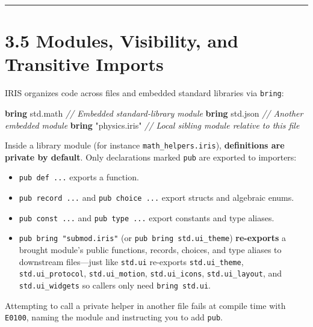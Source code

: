 \documentclass[
  english,
  oneside]{book}
\newenvironment{Shaded}{\begin{snugshade}}{\end{snugshade}}
\newcommand{\CommentTok}[1]{\textcolor[rgb]{0.42,0.60,0.33}{\textit{#1}}}
\newcommand{\KeywordTok}[1]{\textcolor[rgb]{0.34,0.61,0.84}{\textbf{#1}}}
\newcommand{\NormalTok}[1]{\textcolor[rgb]{0.83,0.83,0.83}{#1}}
\newcommand{\OperatorTok}[1]{\textcolor[rgb]{0.83,0.83,0.83}{#1}}
\newcommand{\StringTok}[1]{\textcolor[rgb]{0.81,0.57,0.47}{#1}}
\providecommand{\tightlist}{%
  \setlength{\itemsep}{0pt}\setlength{\parskip}{0pt}}
\begin{document}
\begin{center}\rule{0.5\linewidth}{0.5pt}\end{center}

\section{3.5 Modules, Visibility, and Transitive
Imports}\label{modules-visibility-and-transitive-imports}

IRIS organizes code across files and embedded standard libraries via
\texttt{bring}:

\begin{Shaded}
\begin{Highlighting}[]
\KeywordTok{bring}\NormalTok{ std}\OperatorTok{.}\NormalTok{math              }\CommentTok{// Embedded standard{-}library module}
\KeywordTok{bring}\NormalTok{ std}\OperatorTok{.}\NormalTok{json              }\CommentTok{// Another embedded module}
\KeywordTok{bring} \StringTok{"physics.iris"}        \CommentTok{// Local sibling module relative to this file}
\end{Highlighting}
\end{Shaded}

Inside a library module (for instance \texttt{math\_helpers.iris}),
\textbf{definitions are private by default}. Only declarations marked
\texttt{pub} are exported to importers:

\begin{itemize}
\tightlist
\item
  \texttt{pub\ def\ ...} exports a function.
\item
  \texttt{pub\ record\ ...} and \texttt{pub\ choice\ ...} export structs
  and algebraic enums.
\item
  \texttt{pub\ const\ ...} and \texttt{pub\ type\ ...} export constants
  and type aliases.
\item
  \texttt{pub\ bring\ "submod.iris"} (or
  \texttt{pub\ bring\ std.ui\_theme}) \textbf{re-exports} a brought
  module's public functions, records, choices, and type aliases to
  downstream files---just like \texttt{std.ui} re-exports
  \texttt{std.ui\_theme}, \texttt{std.ui\_protocol},
  \texttt{std.ui\_motion}, \texttt{std.ui\_icons},
  \texttt{std.ui\_layout}, and \texttt{std.ui\_widgets} so callers only
  need \texttt{bring\ std.ui}.
\end{itemize}

Attempting to call a private helper in another file fails at compile
time with \texttt{E0100}, naming the module and instructing you to add
\texttt{pub}.
\end{document}
